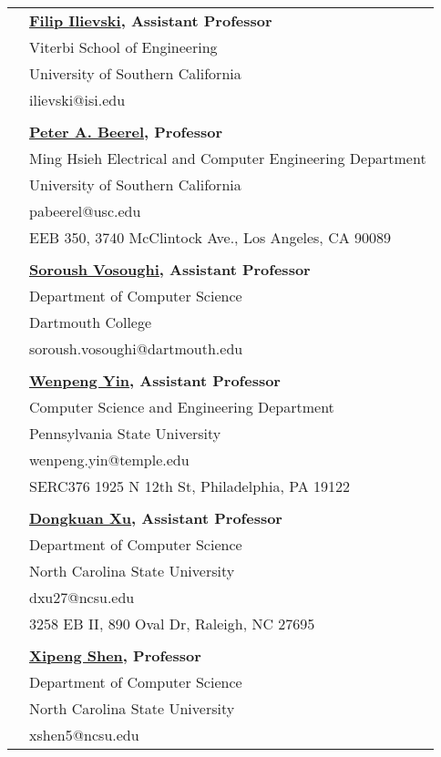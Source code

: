 \documentclass[letterpaper, 10pt]{article}
\begin{document}
\begin{longtable}{p{1.3in}p{4.8in}}
{\color{black}{References}} 
& \textbf{\href{https://usc-isi-i2.github.io/ilievski/}{Filip Ilievski}, Assistant Professor}\\
&  Viterbi School of Engineering \\
&  University of Southern California \\
&  ilievski@isi.edu \\
\\
& \textbf{\href{https://sites.usc.edu/eessc/people/}{Peter A. Beerel}, Professor}\\
&  Ming Hsieh Electrical and Computer Engineering Department \\
&  University of Southern California \\
&  pabeerel@usc.edu \\
&  EEB 350, 3740 McClintock Ave., Los Angeles, CA 90089 \\
\\
& \textbf{\href{https://www.cs.dartmouth.edu/~soroush//}{Soroush Vosoughi}, Assistant Professor}\\
&  Department of Computer Science \\
&  Dartmouth College \\
&  soroush.vosoughi@dartmouth.edu \\
\\
& \textbf{\href{https://www.wenpengyin.org/}{Wenpeng Yin}, Assistant Professor}\\
&  Computer Science and Engineering Department \\
&  Pennsylvania State University \\
&  wenpeng.yin@temple.edu \\
&  SERC376 1925 N 12th St, Philadelphia, PA 19122 \\
\\
& \textbf{\href{http://personal.psu.edu/dux19/}{Dongkuan Xu}, Assistant Professor}\\
&  Department of Computer Science \\
&  North Carolina State University \\
&  dxu27@ncsu.edu \\
&  3258 EB II, 890 Oval Dr, Raleigh, NC 27695 \\
\\
& \textbf{\href{https://people.engr.ncsu.edu/xshen5/}{Xipeng Shen}, Professor}\\
&  Department of Computer Science \\
&  North Carolina State University \\
&  xshen5@ncsu.edu \\







\end{longtable}
\end{document}
